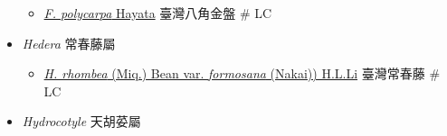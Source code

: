 \begin{itemize}
  \begin{itemize}
        \item[] \href{http://www.theplantlist.org/tpl1.1/search?q=Fatsia+polycarpa}{\textit{F. polycarpa} Hayata}   臺灣八角金盤  \# LC
  \end{itemize}
 \item[] \textit{Hedera} 常春藤屬
                                
  \begin{itemize}
        \item[] \href{http://www.theplantlist.org/tpl1.1/search?q=Hedera+rhombea+var.+formosana}{\textit{H. rhombea} (Miq.) Bean var. \textit{formosana} (Nakai)) H.L.Li}   臺灣常春藤  \# LC
  \end{itemize}
 \item[] \textit{Hydrocotyle} 天胡荽屬
                                

\end{itemize}
